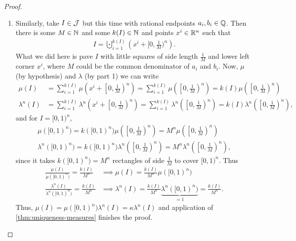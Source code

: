 \begin{proof}
\begin{enumerate}
		\item Similarly, take $I \in \mathcal{J}$ but this time with rational endpoints $a_i, b_i \in \mathbb{Q}$. Then there is some $M \in \mathbb{N}$ and some $k(I) \in \mathbb{N}$ and points $x^i \in \mathbb{R}^n$ such that
		\begin{align}
			I =\bigcupdot_{i = 1}^{k(I)} \left(x^i + [0, \frac{1}{M})^n\right).
		\end{align}
		What we did here is pave $I$ with little squares of side length $\frac{1}{M}$ and lower left corner $x^i$, where $M$ could be the common denominator of $a_i$ and $b_i$. Now, $\mu$ (by hypothesis) and $\lambda$ (by part 1) we can write
		\begin{align*}
			\mu(I)
			&= \sum_{i=1}^{k(I)} \mu\left(x^i + \left[0, \frac{1}{M}\right)^n\right)
			= \sum_{i=1}^{k(I)}  \mu\left(\left[0, \frac{1}{M}\right)^n\right)
			= k(I) \mu\left( \left[0, \frac{1}{M}\right)^n \right) \\
			\lambda^n(I)
			&= \sum_{i=1}^{k(I)} \lambda^n\left(x^i + \left[0, \frac{1}{M}\right)^n\right)
			= \sum_{i=1}^{k(I)}  \lambda^n\left(\left[0, \frac{1}{M}\right)^n\right)
			= k(I) \lambda^n\left( \left[0, \frac{1}{M}\right)^n \right),
		\end{align*}
		and for $I = [0,1)^n$,
		\begin{align*}
			\mu([0,1)^n)
			= k([0,1)^n) \mu\left( \left[0, \frac{1}{M}\right)^n \right)
			= M^n \mu\left( \left[0, \frac{1}{M}\right)^n \right) \\
			\lambda^n([0,1)^n)
			= k([0,1)^n) \lambda^n\left( \left[0, \frac{1}{M}\right)^n \right)
			= M^n \lambda^n\left( \left[0, \frac{1}{M}\right)^n \right),
		\end{align*}
		since it takes $k([0,1)^n) = M^n$ rectangles of side $\frac{1}{M}$ to cover $[0,1)^n$.
		Thus
		\begin{align*}
			\frac{\mu(I)}{\mu([0,1)^n)} = \frac{k(I)}{M^n} &\implies \mu(I) = \frac{k(I)}{M^n}\mu([0,1)^n) \\
			\frac{\lambda^n(I)}{\lambda^n([0,1)^n)} = \frac{k(I)}{M^n} &\implies \lambda^n(I) = \frac{k(I)}{M^n} \underbrace{\lambda^n([0,1)^n)}_{=1} = \frac{k(I)}{M^n}.
		\end{align*}
		Thus, $\mu(I) = \mu([0,1)^n) \lambda^n(I) = \kappa \lambda^n(I)$ and application of \autoref{thm:uniqueness-measures} finishes the proof.
	\end{enumerate}
\end{proof}